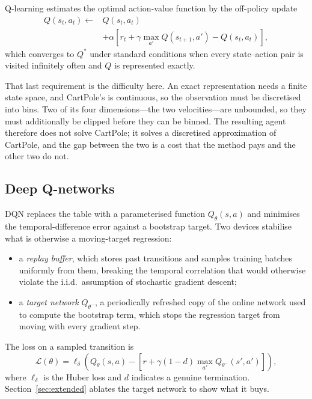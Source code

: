 \documentclass[conference]{IEEEtran}
\begin{document}
Q-learning \cite{watkins1992} estimates the optimal action-value function by the
off-policy update
\begin{equation}
\begin{split}
Q(s_t,a_t) \leftarrow{} & Q(s_t,a_t) \\
  & + \alpha \left[ r_t + \gamma \max_{a'} Q(s_{t+1},a') - Q(s_t,a_t) \right],
\end{split}
\end{equation}
which converges to $Q^{*}$ under standard conditions when every state--action
pair is visited infinitely often and $Q$ is represented exactly.

That last requirement is the difficulty here. An exact representation needs a
finite state space, and CartPole's is continuous, so the observation must be
discretised into bins. Two of its four dimensions---the two velocities---are
unbounded, so they must additionally be clipped before they can be binned. The
resulting agent therefore does not solve CartPole; it solves a discretised
approximation of CartPole, and the gap between the two is a cost that the method
pays and the other two do not.

\subsection{Deep Q-networks}

DQN \cite{mnih2015} replaces the table with a parameterised function
$Q_\theta(s,a)$ and minimises the temporal-difference error against a bootstrap
target. Two devices stabilise what is otherwise a moving-target regression:

\begin{itemize}
\item a \emph{replay buffer}, which stores past transitions and samples training
      batches uniformly from them, breaking the temporal correlation that would
      otherwise violate the i.i.d.\ assumption of stochastic gradient descent;
\item a \emph{target network} $Q_{\theta^-}$, a periodically refreshed copy of
      the online network used to compute the bootstrap term, which stops the
      regression target from moving with every gradient step.
\end{itemize}

The loss on a sampled transition is
\begin{equation}
\mathcal{L}(\theta) = \ell_{\delta}\!\left(
  Q_\theta(s,a) -
  \left[ r + \gamma (1 - d) \max_{a'} Q_{\theta^-}(s',a') \right]
\right),
\end{equation}
where $\ell_{\delta}$ is the Huber loss and $d$ indicates a genuine termination.
Section~\ref{sec:extended} ablates the target network to show what it buys.
\end{document}
